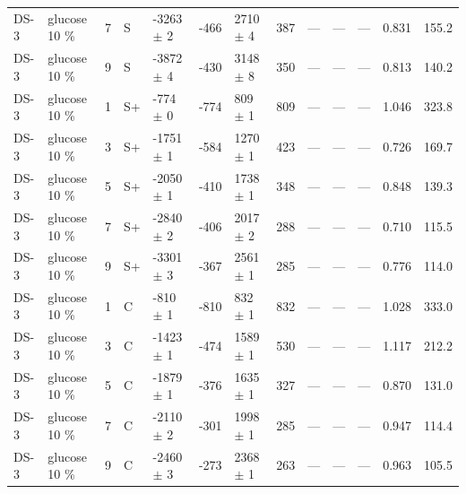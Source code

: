 \documentclass[11pt,a4paper]{article}
\begin{document}
\begin{landscape}
{\begin{longtable}{@{}lllllllllllll@{}}
DS-3 & glucose 10 \% & 7 & S & -3263 $\pm$ 2 & -466 & 2710 $\pm$ 4 & 387 & --- & --- & --- & 0.831 & 155.2 \\
DS-3 & glucose 10 \% & 9 & S & -3872 $\pm$ 4 & -430 & 3148 $\pm$ 8 & 350 & --- & --- & --- & 0.813 & 140.2 \\
DS-3 & glucose 10 \% & 1 & S+ & -774 $\pm$ 0 & -774 & 809 $\pm$ 1 & 809 & --- & --- & --- & 1.046 & 323.8 \\
DS-3 & glucose 10 \% & 3 & S+ & -1751 $\pm$ 1 & -584 & 1270 $\pm$ 1 & 423 & --- & --- & --- & 0.726 & 169.7 \\
DS-3 & glucose 10 \% & 5 & S+ & -2050 $\pm$ 1 & -410 & 1738 $\pm$ 1 & 348 & --- & --- & --- & 0.848 & 139.3 \\
DS-3 & glucose 10 \% & 7 & S+ & -2840 $\pm$ 2 & -406 & 2017 $\pm$ 2 & 288 & --- & --- & --- & 0.710 & 115.5 \\
DS-3 & glucose 10 \% & 9 & S+ & -3301 $\pm$ 3 & -367 & 2561 $\pm$ 1 & 285 & --- & --- & --- & 0.776 & 114.0 \\
DS-3 & glucose 10 \% & 1 & C & -810 $\pm$ 1 & -810 & 832 $\pm$ 1 & 832 & --- & --- & --- & 1.028 & 333.0 \\
DS-3 & glucose 10 \% & 3 & C & -1423 $\pm$ 1 & -474 & 1589 $\pm$ 1 & 530 & --- & --- & --- & 1.117 & 212.2 \\
DS-3 & glucose 10 \% & 5 & C & -1879 $\pm$ 1 & -376 & 1635 $\pm$ 1 & 327 & --- & --- & --- & 0.870 & 131.0 \\
DS-3 & glucose 10 \% & 7 & C & -2110 $\pm$ 2 & -301 & 1998 $\pm$ 1 & 285 & --- & --- & --- & 0.947 & 114.4 \\
DS-3 & glucose 10 \% & 9 & C & -2460 $\pm$ 3 & -273 & 2368 $\pm$ 1 & 263 & --- & --- & --- & 0.963 & 105.5 \\
\bottomrule
\end{longtable}}\end{landscape}
\end{document}
